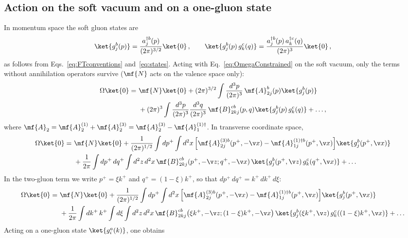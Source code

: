 \subsection{Action on the soft vacuum and on a one-gluon state}\label{subsec:omegastates}
In momentum space the soft gluon states are
\begin{align}\label{eq:statesmom}
\ket{g^{b}_{j}(p)}=\frac{a^{\dagger b}_{j}(p)}{(2\pi)^{3/2}}\ket{0}\,,\qquad
\ket{g^{b}_{j}(p)\,g^{c}_{k}(q)}=\frac{a^{\dagger b}_{j}(p)\,a^{\dagger c}_{k}(q)}{(2\pi)^{3}}\ket{0}\,,
\end{align}
as follows from Eqs.~\eqref{eq:FTconventions} and~\eqref{eq:states}. Acting with Eq.~\eqref{eq:OmegaConstrained} on the soft
vacuum, only the terms without annihilation operators survive ($\mf{N}$ acts on the valence space only):
\begin{align}\label{eq:Omegavac}
\Omega\ket{0} =\ &\mf{N}\ket{0}+(2\pi)^{3/2}\int\frac{d^3p}{(2\pi)^3}\,\mf{A}^{b}_{2j}(p)\ket{g^{b}_{j}(p)}\notag\\
&+(2\pi)^3\int\frac{d^3p}{(2\pi)^3}\frac{d^3q}{(2\pi)^3}\,\mf{B}^{cb}_{2kj}(p,q)\ket{g^{b}_{j}(p)\,g^{c}_{k}(q)}+\dots,
\end{align}
where $\mf{A}_{2}=\mf{A}^{(1)}_{2}+\mf{A}^{(3)}_{2}=\mf{A}^{(3)}_{2}-\mf{A}^{(1)\dagger}_{1}$. In transverse
coordinate space,
\begin{align}\label{Omegaonvacpos}
\Omega\ket{0} =\ &\mf{N}\ket{0}
+\frac{1}{(2\pi)^{1/2}}\int dp^{+}\int d^{2}x\,
\Big[\mf{A}^{(3)b}_{2j}(p^{+},-\v x)-\mf{A}^{(1)\dagger b}_{1j}(p^{+},\v x)\Big]\ket{g^{b}_{j}(p^{+},\v x)}\notag\\
&+\frac{1}{2\pi}\int dp^{+}\,dq^{+}\int d^{2}z\,d^{2}x\,\mf{B}^{cb}_{2kj}(p^{+},-\v z;q^{+},-\v x)\,
\ket{g^{b}_{j}(p^{+},\v z)\,g^{c}_{k}(q^{+},\v x)}+\dots
\end{align}
In the two-gluon term we write $p^{+}=\xi k^{+}$ and $q^{+}=(1-\xi)k^{+}$, so that
$dp^{+}\,dq^{+}=k^{+}\,dk^{+}\,d\xi$:
\begin{align}\label{Omegaonvacposzeta}
\Omega\ket{0} =\ &\mf{N}\ket{0}
+\frac{1}{(2\pi)^{1/2}}\int dp^{+}\int d^{2}x\,
\Big[\mf{A}^{(3)b}_{2j}(p^{+},-\v x)-\mf{A}^{(1)\dagger b}_{1j}(p^{+},\v x)\Big]\ket{g^{b}_{j}(p^{+},\v x)}\notag\\
&+\frac{1}{2\pi}\int dk^{+}\,k^{+}\int d\xi\int d^{2}z\,d^{2}x\,
\mf{B}^{cb}_{2kj}\big(\xi k^{+},-\v z;(1-\xi)k^{+},-\v x\big)\,
\ket{g^{b}_{j}(\xi k^{+},\v z)\,g^{c}_{k}((1-\xi)k^{+},\v x)}+\dots
\end{align}
Acting on a one-gluon state $\ket{g^{a}_{i}(k)}$, one obtains
